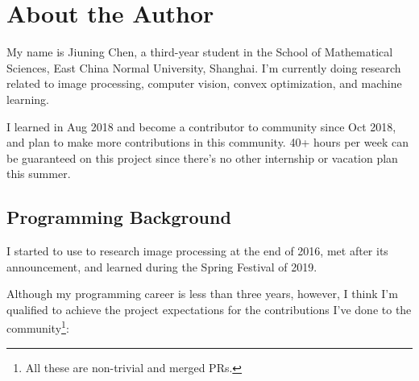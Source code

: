 
\section{About the Author}\label{sec:about_author}

My name is \textsf{Jiuning Chen}, a third-year student in the School of Mathematical Sciences, East China Normal University, Shanghai. I'm currently doing research related to image processing, computer vision, convex optimization, and machine learning.\par

I learned \langjulia in Aug 2018 and become a contributor to \langjulia community since Oct 2018, and plan to make more contributions in this community. 40+ hours per week can be guaranteed on this project since there's no other internship or vacation plan this summer.\par

\subsection*{Programming Background}

I started to use \langmatlab to research image processing at the end of 2016, met  \langjulia after its  announcement, and learned \langpython during the Spring Festival of 2019. \par

Although my programming career is less than three years, however, I think I'm qualified to achieve the project expectations for the contributions I've done to the \langjulia{} community\footnote{All these are non-trivial and merged PRs.}:

